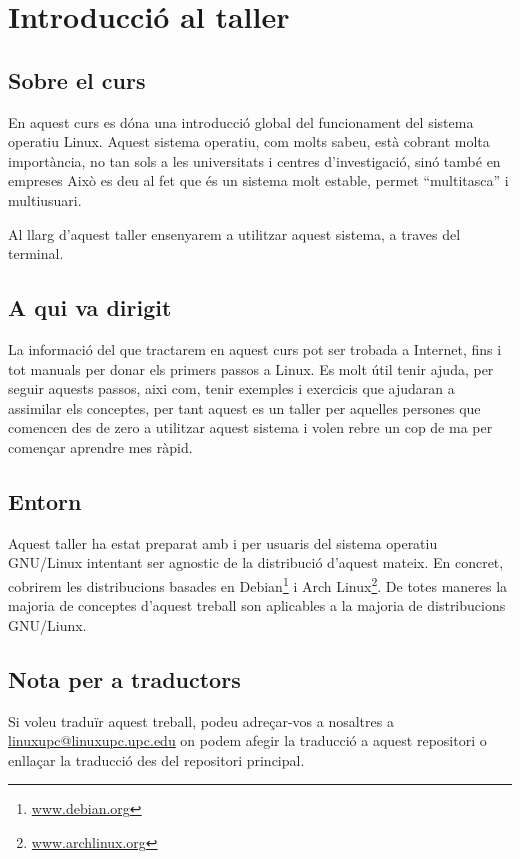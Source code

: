 \section{Introducció al taller}

\subsection{Sobre el curs}

\par
En aquest curs es dóna una introducció global del funcionament del sistema operatiu Linux.
Aquest sistema operatiu, com molts sabeu, està cobrant molta importància, no tan sols a les universitats i centres d'investigació, sinó també en empreses
Això es deu al fet que és un sistema molt estable, permet ``multitasca'' i multiusuari.
\par
Al llarg d'aquest taller ensenyarem a utilitzar aquest sistema, a traves del terminal.

\subsection{A qui va dirigit}

\par
La informació del que tractarem en aquest curs pot ser trobada a Internet, fins i tot manuals per donar els primers passos a Linux.
Es molt útil tenir ajuda, per seguir aquests passos, aixi com, tenir exemples i exercicis que ajudaran a assimilar els conceptes, per tant aquest es un taller per aquelles persones que comencen des de zero a utilitzar aquest sistema i volen rebre un cop de ma per començar aprendre mes ràpid.

\subsection{Entorn}

\par
Aquest taller ha estat preparat amb i per usuaris del sistema operatiu GNU/Linux intentant
ser agnostic de la distribució d'aquest mateix. En concret, cobrirem les distribucions basades
en Debian\footnote{\url{www.debian.org}} i Arch Linux\footnote{\url{www.archlinux.org}}. 
De totes maneres la majoria de conceptes d'aquest treball son aplicables a la majoria de
distribucions GNU/Liunx.

\subsection{Nota per a traductors}

\par
Si voleu traduïr aquest treball, podeu adreçar-vos a nosaltres a \href{mailto:linuxupc@linuxupc.upc.edu}{linuxupc@linuxupc.upc.edu}
on podem afegir la traducció a aquest repositori o enllaçar la traducció des del repositori principal.
